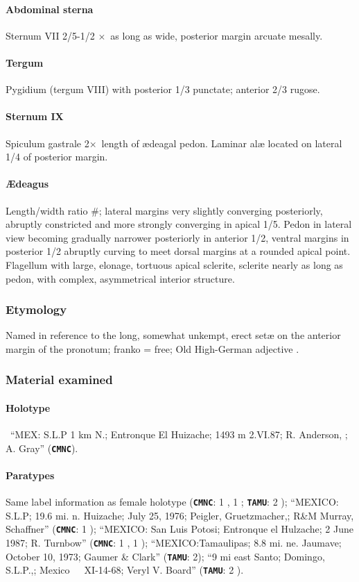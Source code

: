 \documentclass[fleqn,10pt,lineno]{wlpeerj} %
\newcommand{\x}{$\times$~}
\begin{document}
			\paragraph{Abdominal sterna}
				Sternum VII 2/5-1/2 \x as long as wide, posterior margin arcuate mesally.
			\paragraph{Tergum}
				Pygidium (tergum VIII) with posterior 1/3 punctate; anterior 2/3 rugose.
			\paragraph{Sternum IX}
				Spiculum gastrale 2\x length of {\ae}deagal pedon. Laminar al{\ae} located on lateral 1/4 of posterior margin.
			\paragraph{{\AE}deagus}
				Length/width ratio \#; lateral margins very slightly converging posteriorly, abruptly constricted and more strongly converging in apical 1/5.
				Pedon in lateral view becoming gradually narrower posteriorly in anterior 1/2, ventral margins in posterior 1/2 abruptly curving to meet dorsal margins at a rounded apical point.
				Flagellum with large, elonage, tortuous apical sclerite, sclerite nearly as long as pedon, with complex, asymmetrical interior structure.
		\subsubsection*{Etymology}
			Named in reference to the long, somewhat unkempt, erect set{\ae} on the anterior margin of the pronotum; franko = free; Old High-German adjective \citep{brown1956}.
		\subsubsection*{Material examined}
			\paragraph{Holotype}
				\female~``MEX: S.L.P 1 km N.; Entronque El Huizache; 1493 m 2.VI.87; R. Anderson, \underline{}; \underline{} A. Gray'' (\texttt{\textbf{CMNC}}).
			\paragraph{Paratypes}
				Same label information as female holotype (\texttt{\textbf{CMNC}}:  1 \female, 1 \male; \texttt{\textbf{TAMU}}: 2 \male);
				``MEXICO: S.L.P; 19.6 mi. n. Huizache; July 25, 1976; Peigler, Gruetzmacher,; R\&M Murray, Schaffner'' (\texttt{\textbf{CMNC}}: 1 \male);
				``MEXICO: San Luis Potosi; Entronque el Hulzache; 2 June 1987; R. Turnbow'' (\texttt{\textbf{CMNC}}: 1 \female, 1 \male);
				``MEXICO:Tamaulipas; 8.8 mi. ne. Jaumave; October 10, 1973; Gaumer \& Clark'' (\texttt{\textbf{TAMU}}: 2\female);
				``9 mi east Santo; Domingo, S.L.P.,; Mexico~~~XI-14-68; Veryl V. Board'' (\texttt{\textbf{TAMU}}: 2 \male).
\end{document}
